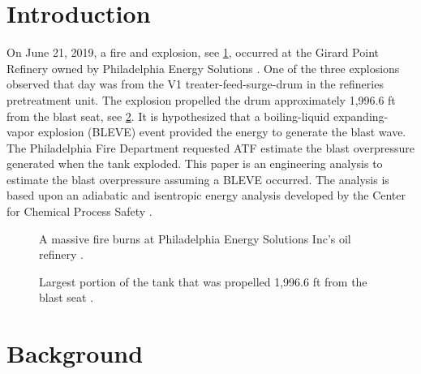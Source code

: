 \documentclass[10pt,parskip=half,
toc=sectionentrywithdots,
bibliography=totocnumbered,
captions=tableheading,numbers=noendperiod]{scrartcl}
\begin{document}
    \begingroup
    \let\cleardoublepage\relax
    \let\clearpage\relax\tableofcontents
    \endgroup

\hypertarget{introduction}{%
\section{Introduction}\label{introduction}}

On June 21, 2019, a fire and explosion, see \cref{fig:fire}, occurred at
the Girard Point Refinery owned by Philadelphia Energy Solutions
\cite{Renshaw2019}. One of the three explosions observed that day was
from the V1 treater-feed-surge-drum in the refineries pretreatment unit.
The explosion propelled the drum approximately 1,996.6 ft from the blast
seat, see \cref{fig:tank}. It is hypothesized that a boiling-liquid
expanding-vapor explosion (BLEVE) event provided the energy to generate
the blast wave. The Philadelphia Fire Department requested ATF estimate
the blast overpressure generated when the tank exploded. This paper is
an engineering analysis to estimate the blast overpressure assuming a
BLEVE occurred. The analysis is based upon an adiabatic and isentropic
energy analysis developed by the Center for Chemical Process Safety
\cite{Safety2010}.

\begin{figure}[H]
\hypertarget{fig:fire}{%
\begin{center}
\end{center}
\caption{A massive fire burns at Philadelphia Energy Solutions Inc's oil refinery
\cite{Maykuth2019}.}\label{fig:fire}
}
\end{figure}

\begin{figure}[H]
\hypertarget{fig:tank}{%
\begin{center}
\end{center}
\caption{Largest portion of the tank that was propelled 1,996.6 ft from the blast
seat \cite{Malone2019}.}\label{fig:tank}
}
\end{figure}

\hypertarget{background}{%
\section{Background}\label{background}}
\end{document}
